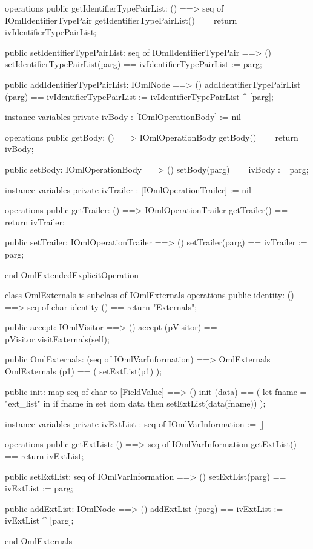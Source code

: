 \begin{vdm_al}
operations
  public getIdentifierTypePairList: () ==> seq of IOmlIdentifierTypePair
  getIdentifierTypePairList() == return ivIdentifierTypePairList;

  public setIdentifierTypePairList: seq of IOmlIdentifierTypePair ==> ()
  setIdentifierTypePairList(parg) == ivIdentifierTypePairList := parg;

  public addIdentifierTypePairList: IOmlNode ==> ()
  addIdentifierTypePairList (parg) == ivIdentifierTypePairList := ivIdentifierTypePairList ^ [parg];

instance variables
  private ivBody : [IOmlOperationBody] := nil

operations
  public getBody: () ==> IOmlOperationBody
  getBody() == return ivBody;

  public setBody: IOmlOperationBody ==> ()
  setBody(parg) == ivBody := parg;

instance variables
  private ivTrailer : [IOmlOperationTrailer] := nil

operations
  public getTrailer: () ==> IOmlOperationTrailer
  getTrailer() == return ivTrailer;

  public setTrailer: IOmlOperationTrailer ==> ()
  setTrailer(parg) == ivTrailer := parg;

end OmlExtendedExplicitOperation
\end{vdm_al}

\begin{vdm_al}
class OmlExternals is subclass of IOmlExternals
operations
  public identity: () ==> seq of char
  identity () == return "Externals";

  public accept: IOmlVisitor ==> ()
  accept (pVisitor) == pVisitor.visitExternals(self);

  public OmlExternals:
      (seq of IOmlVarInformation) ==> OmlExternals
  OmlExternals (p1) == 
   ( setExtList(p1) );

  public init: map seq of char to [FieldValue] ==> ()
  init (data) ==
    ( let fname = "ext_list" in
        if fname in set dom data
        then setExtList(data(fname)) );

instance variables
  private ivExtList : seq of IOmlVarInformation := []

operations
  public getExtList: () ==> seq of IOmlVarInformation
  getExtList() == return ivExtList;

  public setExtList: seq of IOmlVarInformation ==> ()
  setExtList(parg) == ivExtList := parg;

  public addExtList: IOmlNode ==> ()
  addExtList (parg) == ivExtList := ivExtList ^ [parg];

end OmlExternals
\end{vdm_al}

